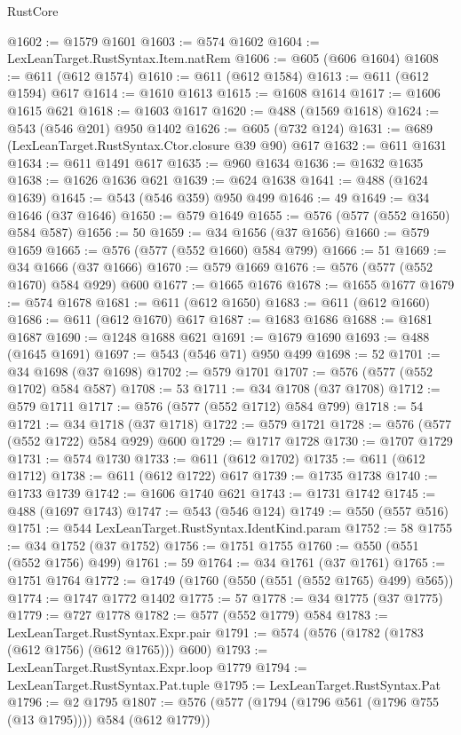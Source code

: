 \begin{lexlean}{RustCore}
\begin{coremodule}
@1602 := @1579 @1601
@1603 := @574 @1602
@1604 := LexLeanTarget.RustSyntax.Item.natRem
@1606 := @605 (@606 @1604)
@1608 := @611 (@612 @1574)
@1610 := @611 (@612 @1584)
@1613 := @611 (@612 @1594) @617
@1614 := @1610 @1613
@1615 := @1608 @1614
@1617 := @1606 @1615 @621
@1618 := @1603 @1617
@1620 := @488 (@1569 @1618)
@1624 := @543 (@546 @201) @950 @1402
@1626 := @605 (@732 @124)
@1631 := @689 (LexLeanTarget.RustSyntax.Ctor.closure @39 @90) @617
@1632 := @611 @1631
@1634 := @611 @1491 @617
@1635 := @960 @1634
@1636 := @1632 @1635
@1638 := @1626 @1636 @621
@1639 := @624 @1638
@1641 := @488 (@1624 @1639)
@1645 := @543 (@546 @359) @950 @499
@1646 := 49
@1649 := @34 @1646 (@37 @1646)
@1650 := @579 @1649
@1655 := @576 (@577 (@552 @1650) @584 @587)
@1656 := 50
@1659 := @34 @1656 (@37 @1656)
@1660 := @579 @1659
@1665 := @576 (@577 (@552 @1660) @584 @799)
@1666 := 51
@1669 := @34 @1666 (@37 @1666)
@1670 := @579 @1669
@1676 := @576 (@577 (@552 @1670) @584 @929) @600
@1677 := @1665 @1676
@1678 := @1655 @1677
@1679 := @574 @1678
@1681 := @611 (@612 @1650)
@1683 := @611 (@612 @1660)
@1686 := @611 (@612 @1670) @617
@1687 := @1683 @1686
@1688 := @1681 @1687
@1690 := @1248 @1688 @621
@1691 := @1679 @1690
@1693 := @488 (@1645 @1691)
@1697 := @543 (@546 @71) @950 @499
@1698 := 52
@1701 := @34 @1698 (@37 @1698)
@1702 := @579 @1701
@1707 := @576 (@577 (@552 @1702) @584 @587)
@1708 := 53
@1711 := @34 @1708 (@37 @1708)
@1712 := @579 @1711
@1717 := @576 (@577 (@552 @1712) @584 @799)
@1718 := 54
@1721 := @34 @1718 (@37 @1718)
@1722 := @579 @1721
@1728 := @576 (@577 (@552 @1722) @584 @929) @600
@1729 := @1717 @1728
@1730 := @1707 @1729
@1731 := @574 @1730
@1733 := @611 (@612 @1702)
@1735 := @611 (@612 @1712)
@1738 := @611 (@612 @1722) @617
@1739 := @1735 @1738
@1740 := @1733 @1739
@1742 := @1606 @1740 @621
@1743 := @1731 @1742
@1745 := @488 (@1697 @1743)
@1747 := @543 (@546 @124)
@1749 := @550 (@557 @516)
@1751 := @544 LexLeanTarget.RustSyntax.IdentKind.param
@1752 := 58
@1755 := @34 @1752 (@37 @1752)
@1756 := @1751 @1755
@1760 := @550 (@551 (@552 @1756) @499)
@1761 := 59
@1764 := @34 @1761 (@37 @1761)
@1765 := @1751 @1764
@1772 := @1749 (@1760 (@550 (@551 (@552 @1765) @499) @565))
@1774 := @1747 @1772 @1402
@1775 := 57
@1778 := @34 @1775 (@37 @1775)
@1779 := @727 @1778
@1782 := @577 (@552 @1779) @584
@1783 := LexLeanTarget.RustSyntax.Expr.pair
@1791 := @574 (@576 (@1782 (@1783 (@612 @1756) (@612 @1765))) @600)
@1793 := LexLeanTarget.RustSyntax.Expr.loop @1779
@1794 := LexLeanTarget.RustSyntax.Pat.tuple
@1795 := LexLeanTarget.RustSyntax.Pat
@1796 := @2 @1795
@1807 := @576 (@577 (@1794 (@1796 @561 (@1796 @755 (@13 @1795)))) @584 (@612 @1779))

\end{coremodule}
\end{lexlean}
